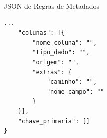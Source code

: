 \begin{frame}[fragile]{JSON de Regras de Metadados}
    \begin{lstlisting}[basicstyle=\ttfamily\footnotesize, frame=single, label={lst:json_metadados_2}]
    ...
    "colunas": [{
        "nome_coluna": "",
        "tipo_dado": "",
        "origem": "",
        "extras": {
            "caminho": "",
            "nome_campo": ""
        }
    }],
    "chave_primaria": []
}
    \end{lstlisting}
\end{frame}